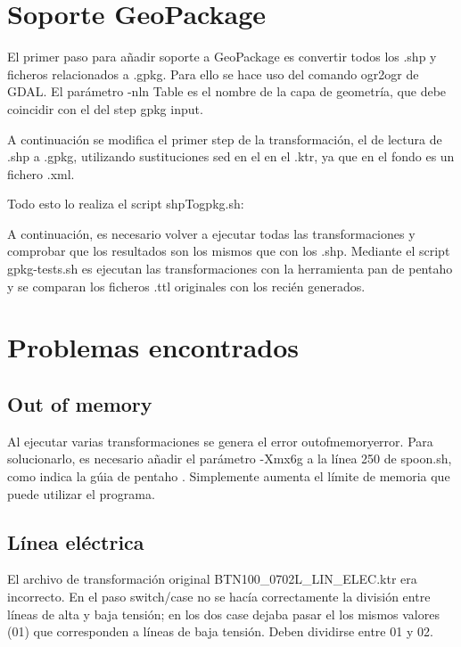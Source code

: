 \section{Soporte GeoPackage}

El primer paso para añadir soporte a GeoPackage es convertir todos los .shp y ficheros relacionados a .gpkg. Para
ello se hace uso del comando ogr2ogr de GDAL\cite{ogr2ogr}. El parámetro -nln Table es el nombre de la capa de
geometría, que debe coincidir con el del step gpkg input.

A continuación se modifica el primer step de la transformación, el de lectura de .shp a .gpkg, utilizando
sustituciones sed en el en el .ktr, ya que en el fondo es un fichero .xml.

Todo esto lo realiza el script shpTogpkg.sh:





A continuación, es necesario volver a ejecutar todas las transformaciones y comprobar que los resultados son los
mismos que con los .shp. Mediante el script gpkg-tests.sh es ejecutan las transformaciones con la herramienta
pan de pentaho y se comparan los ficheros .ttl originales con los recién generados.



\section{Problemas encontrados}

\subsection{Out of memory}
Al ejecutar varias transformaciones se genera el error outofmemoryerror. Para solucionarlo, es necesario añadir
el parámetro -Xmx6g a la línea 250 de spoon.sh, como indica la gúia de pentaho \cite{outofmemory}. Simplemente
aumenta el límite de memoria que puede utilizar el programa.

\subsection{Línea eléctrica}
El archivo de transformación original BTN100\_0702L\_LIN\_ELEC.ktr era incorrecto. En el paso switch/case no se hacía
correctamente la división entre líneas de alta y baja tensión; en los dos case dejaba pasar el los mismos valores
(01) que corresponden a líneas de baja tensión. Deben dividirse entre 01 y 02.

